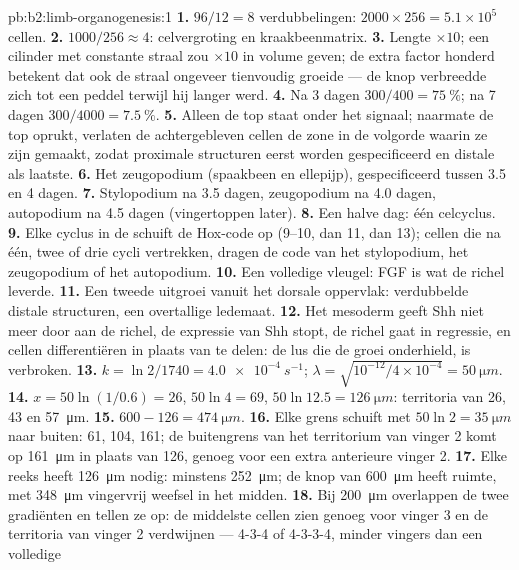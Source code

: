 \begin{solution}{pb:b2:limb-organogenesis:1}
\textbf{1.} $96/12 = 8$ verdubbelingen: $2000\times 256 = 5.1\times 10^{5}$
cellen.
\textbf{2.} $1000/256 \approx 4$: celvergroting en kraakbeenmatrix.
\textbf{3.} Lengte $\times 10$; een cilinder met constante straal zou
$\times 10$ in volume geven; de extra factor honderd betekent dat ook de
straal ongeveer tienvoudig groeide --- de knop verbreedde zich tot een
peddel terwijl hij langer werd.
\textbf{4.} Na 3 dagen $300/400 = \qty{75}{\%}$; na 7 dagen $300/4000 =
\qty{7.5}{\%}$.
\textbf{5.} Alleen de top staat onder het signaal; naarmate de top oprukt,
verlaten de achtergebleven cellen de zone in de volgorde waarin ze zijn
gemaakt, zodat proximale structuren eerst worden gespecificeerd en distale
als laatste.
\textbf{6.} Het zeugopodium (spaakbeen en ellepijp), gespecificeerd tussen
3.5 en 4 dagen.
\textbf{7.} Stylopodium na 3.5 dagen, zeugopodium na 4.0 dagen, autopodium
na 4.5 dagen (vingertoppen later).
\textbf{8.} Een halve dag: één celcyclus.
\textbf{9.} Elke cyclus in de  schuift de Hox-code op (9--10,
dan 11, dan 13); cellen die na één, twee of drie cycli vertrekken, dragen
de code van het stylopodium, het zeugopodium of het autopodium.
\textbf{10.} Een volledige vleugel: FGF is wat de richel leverde.
\textbf{11.} Een tweede uitgroei vanuit het dorsale oppervlak: verdubbelde
distale structuren, een overtallige ledemaat.
\textbf{12.} Het mesoderm geeft Shh niet meer door aan de richel, de
expressie van Shh stopt, de richel gaat in regressie, en cellen
differentiëren in plaats van te delen: de lus die de groei onderhield, is
verbroken.
\textbf{13.} $k = \ln 2/1740 = \qty{4.0e-4}{s^{-1}}$; $\lambda =
\sqrt{10^{-12}/4\times 10^{-4}} = \qty{50}{\micro m}$.
\textbf{14.} $x = 50\ln(1/0.6) = 26$, $50\ln 4 = 69$, $50\ln 12.5 =
\qty{126}{\micro m}$: territoria van 26, 43 en \qty{57}{\micro m}.
\textbf{15.} $600 - 126 = \qty{474}{\micro m}$.
\textbf{16.} Elke grens schuift met $50\ln 2 = \qty{35}{\micro
m}$ naar buiten: 61, 104, 161; de buitengrens van het territorium van
vinger 2 komt op \qty{161}{\micro m} in plaats van 126, genoeg voor een
extra anterieure vinger 2.
\textbf{17.} Elke reeks heeft \qty{126}{\micro m} nodig: minstens
\qty{252}{\micro m}; de knop van \qty{600}{\micro m} heeft ruimte, met
\qty{348}{\micro m} vingervrij weefsel in het midden.
\textbf{18.} Bij \qty{200}{\micro m} overlappen de twee gradiënten en tellen
ze op: de middelste cellen zien genoeg voor vinger 3 en de territoria van
vinger 2 verdwijnen --- 4-3-4 of 4-3-3-4, minder vingers dan een volledige

\end{solution}
